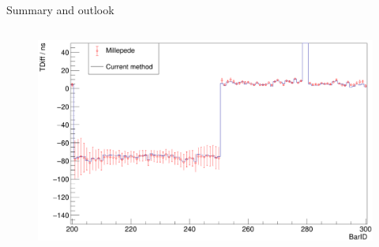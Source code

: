 \documentclass[compress, 13pt, aspectratio=169]{beamer}
\begin{document}
\begin{frame}[t]{Summary and outlook}
\begin{columns}[t]
\begin{column}[t]{0.45\textwidth}
			\begin{figure}[t]
				\hspace*{-0.5cm}
				\centering
				\includegraphics[keepaspectratio, height = 0.5\textheight]{t_error_diff.png}
			\end{figure}
		\end{column}
	\end{columns}
\end{frame}
\end{document}
